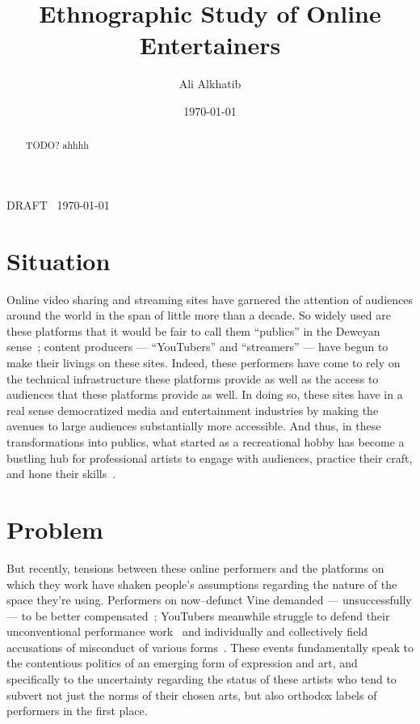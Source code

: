 \documentclass[10pt]{article}
\title{Ethnographic Study of Online Entertainers}
\author{Ali Alkhatib}
\date{\today}
\makeatletter
\def\maketitle{%
\par{\centering {\scshape \huge \textbf{\@title}}%
\par{\@author}
\par{DRAFT \DTMcurrenttime~\today}%
\par}}
\newcommand{\ali}[1]{{\color{Red}[al2: #1]}}
\newcommand{\topic}[1]{{\color{Blue}#1}}
\newcommand{\ugh}[1]{{\color{Gray}#1}}
\makeatother
\begin{document}
  \maketitle
  \begin{abstract}
  TODO? ahhhh
  \end{abstract}



\section*{Situation}
\topic{Online video sharing %
and streaming sites %
have garnered the attention of audiences around the world
in the span of little more than a decade.} %
So widely used are these platforms
that it would be fair to call them ``publics'' in the Deweyan sense~\cite{dewey2012public,disalvo2009design};
content producers
--- ``YouTubers'' and ``streamers'' ---
have begun to make their livings on these sites.
Indeed, these performers have come to rely on
the technical infrastructure these platforms provide as well as
the access to audiences that these platforms provide as well.
In doing so, these sites have in a real sense democratized media and entertainment industries by
making the avenues to large audiences substantially more accessible.
And thus, in these transformations into publics, what started as
a recreational hobby
has become a bustling hub for professional artists to
engage with audiences,
practice their craft, and 
hone their skills~\cite{Hamilton:2014:STF:2611105.2557048,Zhang:2015:CIL:2736084.2736091}.

\section*{Problem}
\topic{But recently, tensions between these online performers and the platforms on which they work have shaken people's
assumptions regarding the nature of the space they're using.}
Performers on now--defunct Vine demanded --- unsuccessfully --- to be better compensated~\cite{vineWantsMoney,vineInsiderMeeting};
YouTubers meanwhile struggle to defend their unconventional performance work~\cite{h3h3Lawsuit}
and individually and collectively field accusations of misconduct of various forms~\cite{youtubeDramaResponses}.
\ugh{These events fundamentally speak to the contentious politics of an emerging form of expression and art,
and specifically to the uncertainty regarding the status of these artists who tend to subvert not just
the norms of their chosen arts, but also
orthodox labels of performers in the first place.}
\end{document}

